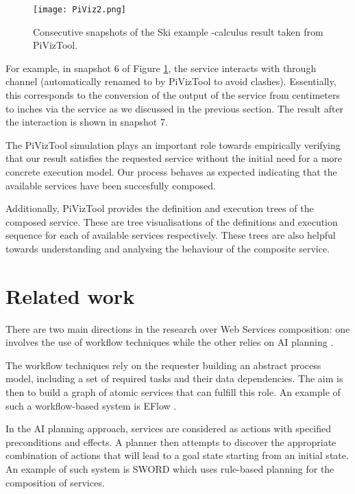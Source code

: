 \documentclass[copyright,creativecommons]{eptcs}
\begin{document}
\begin{figure}[htbp]
\centering
	\texttt{[image: PiViz2.png]}
	\caption{Consecutive snapshots of the Ski example -calculus result taken from PiVizTool. }
	\label{fig:PiViz}
\end{figure}

For example, in snapshot 6 of Figure \ref{fig:PiViz}, the  service interacts with  through channel  (automatically renamed to  by PiVizTool to avoid clashes). Essentially, this corresponds to the conversion of the output of the  service from centimeters to inches via the  service as we discussed in the previous section. The result after the interaction is shown in snapshot 7.

The PiVizTool simulation plays an important role towards empirically verifying that our result satisfies the requested service without the initial need for a more concrete execution model. Our process behaves as expected indicating that the available services have been succesfully composed.

Additionally, PiVizTool provides the definition and execution trees of the composed service. These are tree visualisations of the definitions and execution sequence for each of available services respectively. These trees are also helpful towards understanding and analysing the behaviour of the composite service.

\section{Related work}
\label{relatedwork}

There are two main directions in the research over Web Services composition: one involves the use of workflow techniques while the other relies on AI planning \cite{hendler1990ai}. 

The workflow techniques rely on the requester building an abstract process model, including a set of required tasks and their data dependencies. The aim is then to build a graph of atomic services that can fulfill this role. An example of such a workflow-based system is EFlow \cite{casati2000eflow}. 

In the AI planning approach, services are considered as actions with specified preconditions and effects. A planner then attempts to discover the appropriate combination of actions that will lead to a goal state starting from an initial state. An example of such system is SWORD \cite{ponnekanti2002sword} which uses rule-based planning for the composition of services.
\end{document}
